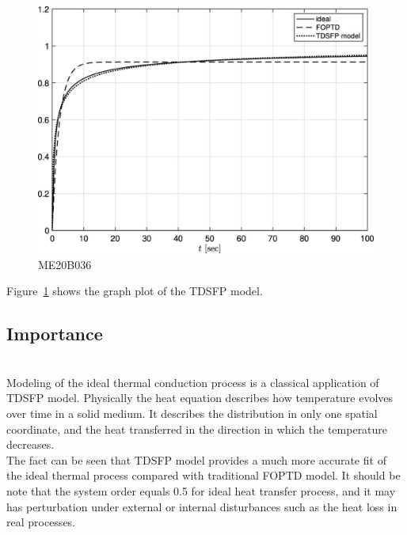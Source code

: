 \documentclass[a4paper, 12pt]{article}
\begin{document}
\begin{figure}[h]
    \begin{center}
        \includegraphics[scale=0.4]{Assgt4.eps}
    \end{center}
    \caption{ME20B036}
    \label{f1:image}
\end{figure}


Figure~\ref{f1:image} shows the graph plot of the TDSFP model.~\cite{YUAN2022108111}
\vspace{1cm}

\subsection{Importance}
\vspace{0.5cm}

\\{Modeling of the ideal thermal conduction process is a classical application of TDSFP model. Physically the heat equation describes how temperature evolves over time in a solid medium. It describes the distribution in only one spatial coordinate, and the heat transferred in the direction in which the temperature decreases.~\cite{YUAN2022108111}}
\vspace{0.5cm}
\\{The fact can be seen that TDSFP model provides a much more accurate fit of the ideal thermal process compared with traditional FOPTD model. It should be note that the system order equals 0.5 for ideal heat transfer process, and it may has perturbation under external or internal disturbances such as the heat loss in real processes.}


%
%
\end{document}
